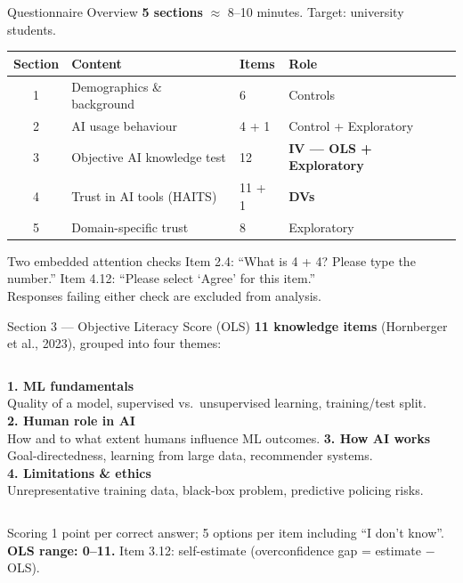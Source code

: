 \documentclass[10pt,aspectratio=169]{beamer}
\begin{document}
\begin{frame}{Questionnaire Overview}
  \textbf{5 sections} $\approx$ 8--10 minutes. Target: university students.
  \medskip
  \begin{center}
  \begin{tabular}{clll}
    \toprule
    \textbf{Section} & \textbf{Content} & \textbf{Items} & \textbf{Role} \\
    \midrule
    1 & Demographics \& background & 6 & Controls \\
    2 & AI usage behaviour & 4 + 1 & Control + Exploratory \\
    3 & Objective AI knowledge test & 12 & \textbf{IV --- OLS + Exploratory} \\
    4 & Trust in AI tools (HAITS) & 11 + 1 & \textbf{DVs} \\
    5 & Domain-specific trust & 8 & Exploratory \\
    \bottomrule
  \end{tabular}
  \end{center}
  \pause
  \begin{exampleblock}{Two embedded attention checks}
    Item 2.4: ``What is 4 + 4? Please type the number.'' \quad
    Item 4.12: ``Please select `Agree' for this item.''\\
    Responses failing either check are excluded from analysis.
  \end{exampleblock}
\end{frame}

\begin{frame}{Section 3 --- Objective Literacy Score (OLS)}
  \textbf{11 knowledge items} (Hornberger et al., 2023), grouped into four themes:
  \medskip
  \begin{columns}[T]
    \textbf{1. ML fundamentals}\\
    \small Quality of a model, supervised vs.\ unsupervised learning,
    training/test split.\\[6pt]
    \textbf{2. Human role in AI}\\
    \small How and to what extent humans influence ML outcomes.
    \textbf{3. How AI works}\\
    \small Goal-directedness, learning from large data, recommender
    systems.\\[6pt]
    \textbf{4. Limitations \& ethics}\\
    \small Unrepresentative training data, black-box problem,
    predictive policing risks.
  \end{columns}
  \vspace{0.6em}
  \begin{block}{Scoring}
    1 point per correct answer; 5 options per item including ``I don't know''.\\
    \textbf{OLS range: 0--11.} \quad
    Item 3.12: self-estimate (overconfidence gap = estimate $-$ OLS).
  \end{block}
\end{frame}
\end{document}

